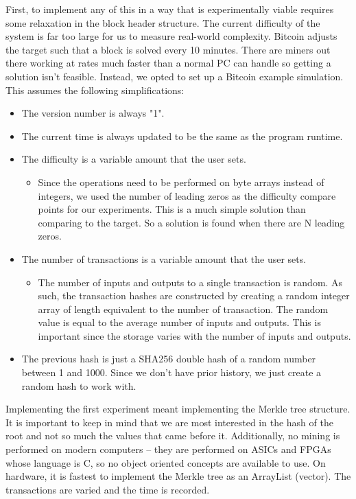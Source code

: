 \documentclass[pdftex,11pt]{article}
\begin{document}
First, to implement any of this in a way that is experimentally viable requires some relaxation in the block header structure. The current difficulty of the system is far too large for us to measure real-world complexity. Bitcoin adjusts the target such that a block is solved every 10 minutes. There are miners out there working at rates much faster than a normal PC can handle so getting a solution isn't feasible. Instead, we opted to set up a Bitcoin example simulation. This assumes the following simplifications:
\begin{itemize}
	\item The version number is always "1".
	\item The current time is always updated to be the same as the program runtime.
	\item The difficulty is a variable amount that the user sets.
	\begin{itemize}	
		\item Since the operations need to be performed on byte arrays instead of integers, we used the number of leading zeros as the difficulty compare points for our experiments. This is a much simple solution than comparing to the target. So a solution is found when there are N leading zeros.
	\end{itemize}
	\item The number of transactions is a variable amount that the user sets.
	\begin{itemize}
		\item The number of inputs and outputs to a single transaction is random. As such, the transaction hashes are constructed by creating a random integer array of length equivalent to the number of transaction. The random value is equal to the average number of inputs and outputs. This is important since the storage varies with the number of inputs and outputs.
	\end{itemize}
	\item The previous hash is just a SHA256 double hash of a random number between 1 and 1000. Since we don't have prior history, we just create a random hash to work with.
\end{itemize}

Implementing the first experiment meant implementing the Merkle tree structure. It is important to keep in mind that we are most interested in the hash of the root and not so much the values that came before it. Additionally, no mining is performed on modern computers -- they are performed on ASICs and FPGAs whose language is C, so no object oriented concepts are available to use. On hardware, it is fastest to implement the Merkle tree as an ArrayList (vector). The transactions are varied and the time is recorded.
\end{document}
